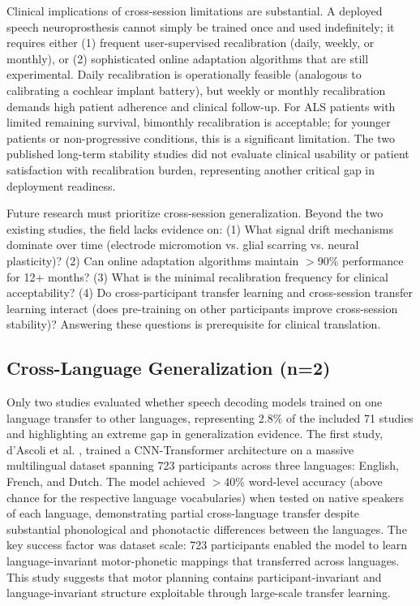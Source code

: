 Clinical implications of cross-session limitations are substantial. A deployed speech neuroprosthesis cannot simply be trained once and used indefinitely; it requires either (1) frequent user-supervised recalibration (daily, weekly, or monthly), or (2) sophisticated online adaptation algorithms that are still experimental. Daily recalibration is operationally feasible (analogous to calibrating a cochlear implant battery), but weekly or monthly recalibration demands high patient adherence and clinical follow-up. For ALS patients with limited remaining survival, bimonthly recalibration is acceptable; for younger patients or non-progressive conditions, this is a significant limitation. The two published long-term stability studies did not evaluate clinical usability or patient satisfaction with recalibration burden, representing another critical gap in deployment readiness.

Future research must prioritize cross-session generalization. Beyond the two existing studies, the field lacks evidence on: (1) What signal drift mechanisms dominate over time (electrode micromotion vs. glial scarring vs. neural plasticity)? (2) Can online adaptation algorithms maintain $>$90\% performance for 12+ months? (3) What is the minimal recalibration frequency for clinical acceptability? (4) Do cross-participant transfer learning and cross-session transfer learning interact (does pre-training on other participants improve cross-session stability)? Answering these questions is prerequisite for clinical translation.

\subsection{Cross-Language Generalization (n=2)}

Only two studies evaluated whether speech decoding models trained on one language transfer to other languages, representing 2.8\% of the included 71 studies and highlighting an extreme gap in generalization evidence. The first study, d'Ascoli et al. \cite{dAscoli2025}, trained a CNN-Transformer architecture on a massive multilingual dataset spanning 723 participants across three languages: English, French, and Dutch. The model achieved $>$40\% word-level accuracy (above chance for the respective language vocabularies) when tested on native speakers of each language, demonstrating partial cross-language transfer despite substantial phonological and phonotactic differences between the languages. The key success factor was dataset scale: 723 participants enabled the model to learn language-invariant motor-phonetic mappings that transferred across languages. This study suggests that motor planning contains participant-invariant and language-invariant structure exploitable through large-scale transfer learning.

